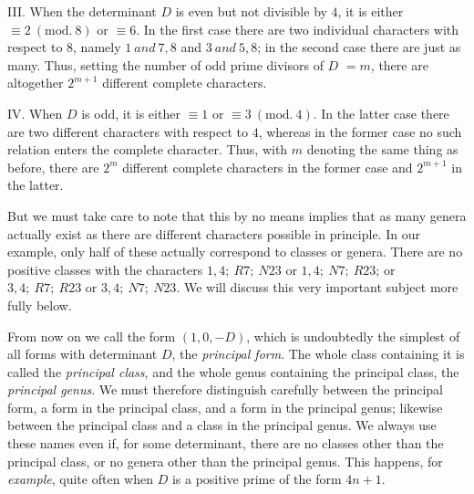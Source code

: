 III. When the determinant $D$ is even but not divisible by $4$, it is either $\equiv2\ (\mathrm{mod.}\ 8)$ or $\equiv6$. In the first case there are two individual characters with respect to $8$, namely $1\ \mathit{and}\ 7,8$ and $3\ \mathit{and}\ 5,8$; in the second case there are just as many. Thus, setting the number of odd prime divisors of $D$ $=m$, there are altogether $2^{m+1}$ different complete characters.

IV. When $D$ is odd, it is either $\equiv1$ or $\equiv3\ (\mathrm{mod.}\ 4)$. In the latter case there are two different characters with respect to $4$, whereas in the former case no such relation enters the complete character. Thus, with $m$ denoting the same thing as before, there are $2^m$ different complete characters in the former case and $2^{m+1}$ in the latter.

But we must take care to note that this by no means implies that as many genera actually
exist as there are different characters possible in principle. In our example, only half of these actually correspond to classes or genera. There are no positive classes with the characters $1,4;\ R7;\ N23$ or $1,4;\ N7;\ R23$; or $3,4;\ R7;\ R23$ or $3,4;\ N7;\ N23$. We will discuss this very important subject more fully below.

From now on we call the form $(1,0,-D)$, which is undoubtedly the simplest of all forms with determinant $D$, the \textit{principal form}. The whole class containing it is called the \textit{principal class}, and the whole genus containing the principal class, the \textit{principal genus}. We must therefore distinguish carefully between the principal form, a form in the principal class, and a form in the principal genus; likewise between the principal class and a class in the principal genus. We always use these names even if, for some determinant, there are no classes other than the principal class, or no genera other than the principal genus. This happens, for \textit{example}, quite often when $D$ is a positive prime of the form $4n+1$.

